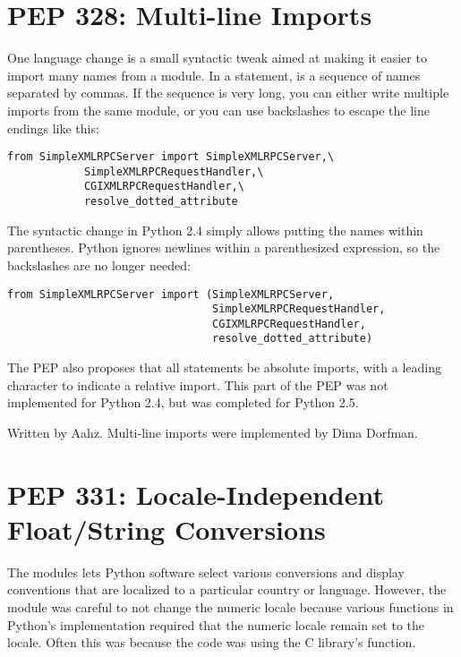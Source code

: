 \documentclass{howto}
\begin{document}
\section{PEP 328: Multi-line Imports}

One language change is a small syntactic tweak aimed at making it
easier to import many names from a module.  In a
 statement, 
 is a sequence of names separated by commas.  If the sequence is 
very long, you can either write multiple imports from the same module,
or you can use backslashes to escape the line endings like this:

\begin{verbatim}
from SimpleXMLRPCServer import SimpleXMLRPCServer,\
            SimpleXMLRPCRequestHandler,\
            CGIXMLRPCRequestHandler,\
            resolve_dotted_attribute
\end{verbatim}

The syntactic change in Python 2.4 simply allows putting the names
within parentheses.  Python ignores newlines within a parenthesized
expression, so the backslashes are no longer needed:

\begin{verbatim}
from SimpleXMLRPCServer import (SimpleXMLRPCServer,
                                SimpleXMLRPCRequestHandler,
                                CGIXMLRPCRequestHandler,
                                resolve_dotted_attribute)
\end{verbatim}

The PEP also proposes that all \keyword{import} statements be absolute
imports, with a leading  character to indicate a relative
import.  This part of the PEP was not implemented for Python 2.4,
but was completed for Python 2.5.

\begin{seealso}
            {Written by Aahz.  Multi-line imports were implemented by
             Dima Dorfman.}
\end{seealso}


\section{PEP 331: Locale-Independent Float/String Conversions}

The \module{locale} modules lets Python software select various
conversions and display conventions that are localized to a particular
country or language.  However, the module was careful to not change
the numeric locale because various functions in Python's
implementation required that the numeric locale remain set to the
\code{'C'} locale.  Often this was because the code was using the C library's
\cfunction{atof()} function.  
\end{document}
